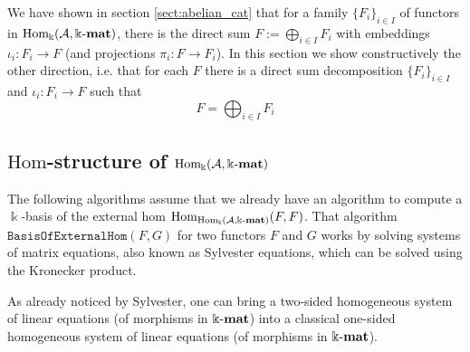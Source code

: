 


We have shown in section \ref{sect:abelian_cat} that for a family $\{F_{i}\}_{i\in I}$ of functors in $\mathrm{Hom_{\Bbbk}}(\mathcal{A},\Bbbk\textnormal{-}\mathbf{mat})$, there is the
direct sum $F := \bigoplus_{i\in I} F_{i}$ with embeddings $\iota_{i} : F_{i} \rightarrow F$ (and projections $\pi_{i} : F \rightarrow F_{i}$).
In this section we show constructively the other direction, i.e. that for each $F$ there is a direct sum decomposition
$\{F_{i}\}_{i\in I}$ and $\iota_{i} : F_{i} \rightarrow F$ such that
\[
F = \bigoplus_{i\in I} F_{i}
\]


\subsection{$\mathrm{Hom}$-structure of $\mathrm{Hom_{\Bbbk}}(\mathcal{A},\Bbbk\textnormal{-}\mathbf{mat})$}

The following algorithms assume that we already have an algorithm to compute a $\Bbbk$-basis of the external hom
$\mathrm{Hom}_{\mathrm{Hom_{\Bbbk}}(\mathcal{A},\Bbbk\textnormal{-}\mathbf{mat})}(F,F)$.
That algorithm $\mathtt{BasisOfExternalHom}( F, G )$ for two functors $F$ and $G$ works by solving systems of matrix equations, also known as
Sylvester equations, which can be solved using the Kronecker product.

As already noticed by Sylvester, one can bring a two-sided homogeneous system of linear equations (of morphisms in $\Bbbk\textnormal{-}\mathbf{mat}$) into a classical
one-sided homogeneous system of linear equations (of morphisms in $\Bbbk\textnormal{-}\mathbf{mat}$).

